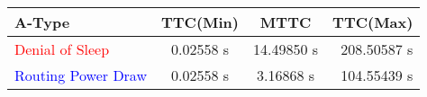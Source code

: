 	\begin{tabular}{| l | c | c | r |}
	\hline
	\textbf{A-Type} & \textbf{TTC(Min)} & \textbf{MTTC} & \textbf{TTC(Max)} \\
	\hline
	\hline
	\textcolor{red}{Denial of Sleep} &  0.02558 s & 14.49850 s & 208.50587 s\\
	\hline
	\textcolor{blue}{Routing Power Draw} &  0.02558 s & 3.16868 s & 104.55439 s\\
	\hline
	\end{tabular}